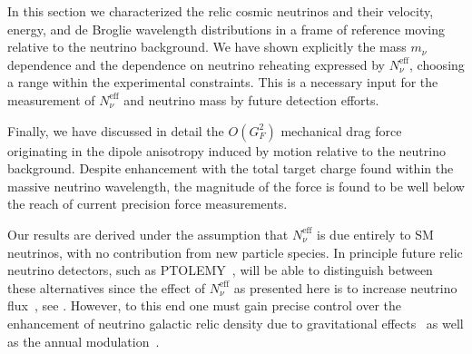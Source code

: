 In this section we characterized the relic cosmic neutrinos and their velocity, energy, and de Broglie wavelength distributions in a frame of reference moving relative to the neutrino background. We have shown explicitly the mass $m_\nu$ dependence and the dependence on neutrino reheating expressed by $N_\nu^{\mathrm{eff}}$, choosing a range within the experimental constraints. This is a necessary input for the measurement of $N_\nu^{\mathrm{eff}}$ and neutrino mass by future detection efforts.  

Finally, we have discussed in detail the $O(G_F^2)$ mechanical drag force  originating in the dipole anisotropy induced by motion relative to the neutrino background.  Despite enhancement with the total target charge found within the massive neutrino wavelength, the magnitude of the force is found to be well below the reach of current  precision force measurements.

Our results are derived under the assumption that $N_\nu^{\mathrm{eff}}$ is due entirely to SM neutrinos, with no contribution from new particle species. In principle future relic neutrino detectors, such as PTOLEMY~\cite{Betts:2013uya,PTOLEMY:2019hkd}, will be able to distinguish between these alternatives since the effect of $N_\nu^{\mathrm{eff}}$ as presented here is to increase neutrino flux~\cite{Birrell:2012gg}, see . However, to this end one must gain precise control over the enhancement of neutrino galactic relic density due to  gravitational effects~\cite{Ringwald:2004np} as well as the annual modulation~\cite{Safdi:2014rza}. 

